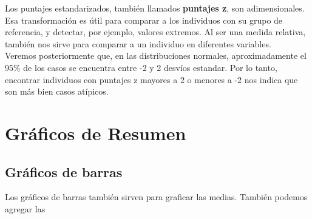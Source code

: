 \documentclass[spanish,]{book}
\begin{document}
Los puntajes estandarizados, también llamados \textbf{puntajes z}, son
adimensionales. Esa transformación es útil para comparar a los
individuos con su grupo de referencia, y detectar, por ejemplo, valores
extremos. Al ser una medida relativa, también nos sirve para comparar a
un individuo en diferentes variables.\\
Veremos posteriormente que, en las distribuciones normales,
aproximadamente el 95\% de los casos se encuentra entre -2 y 2 desvíos
estandar. Por lo tanto, encontrar individuos con puntajes z mayores a 2
o menores a -2 nos indica que son más bien casos atípicos.

\chapter{Gráficos de Resumen}\label{graficos-de-resumen}

\section{Gráficos de barras}\label{graficos-de-barras}

Los gráficos de barras también sirven para graficar las medias. También
podemos agregar las
\end{document}

